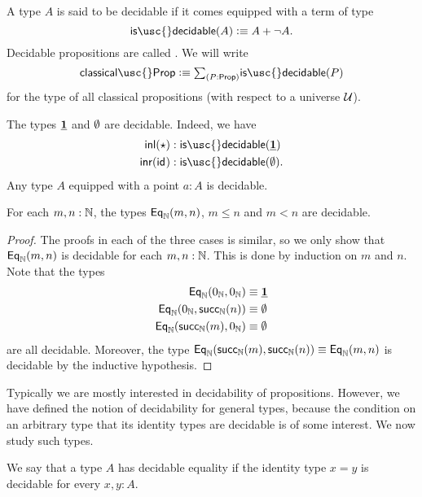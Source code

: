 \begin{defn}
  A type $A$ is said to be decidable if it comes equipped with a term of type
  \begin{equation*}
    \mathsf{is\usc{}decidable}(A)\defeq A+\neg A.
  \end{equation*}
  Decidable propositions are called . We will write
  \begin{equation*}
    \mathsf{classical\usc{}Prop} \defeq \sm{P:\mathsf{Prop}}\mathsf{is\usc{}decidable}(P)
  \end{equation*}
  for the type of all classical propositions (with respect to a universe $\mathcal{U}$).
\end{defn}

\begin{eg}
  The types $\underline{\mathbf{1}}$ and $\emptyset$ are decidable. Indeed, we have
  \begin{align*}
    \inl(\ttt) & :\mathsf{is\usc{}decidable}(\unit) \\
    \inr(\idfunc) & : \mathsf{is\usc{}decidable}(\emptyt).\qedhere
  \end{align*}
  Any type $A$ equipped with a point $a:A$ is decidable.
\end{eg}

\begin{lem}
  For each $m,n:{\mathbb{N}}$, the types $\mathsf{Eq}_{{\mathbb{N}}}(m,n)$, $m\leq n$ and $m<n$ are decidable.
\end{lem}

\begin{proof}
  The proofs in each of the three cases is similar, so we only show that $\mathsf{Eq}_{{\mathbb{N}}}(m,n)$ is decidable for each $m,n:{\mathbb{N}}$. This is done by induction on $m$ and $n$. Note that the types
  \begin{align*}
    \mathsf{Eq}_{{\mathbb{N}}}(0_{{\mathbb{N}}},0_{{\mathbb{N}}}) & \equiv \underline{\mathbf{1}} \\
    \mathsf{Eq}_{{\mathbb{N}}}(0_{{\mathbb{N}}},\mathsf{succ}_{{\mathbb{N}}}(n)) & \equiv \emptyset \\
    \mathsf{Eq}_{{\mathbb{N}}}(\mathsf{succ}_{{\mathbb{N}}}(m),0_{{\mathbb{N}}}) & \equiv \emptyset 
  \end{align*}
  are all decidable. Moreover, the type $\mathsf{Eq}_{{\mathbb{N}}}(\mathsf{succ}_{{\mathbb{N}}}(m),\mathsf{succ}_{{\mathbb{N}}}(n))\equiv \mathsf{Eq}_{{\mathbb{N}}}(m,n)$ is decidable by the inductive hypothesis.
\end{proof}

Typically we are mostly interested in decidability of propositions. However, we have defined the notion of decidability for general types, because the condition on an arbitrary type that its identity types are decidable is of some interest. We now study such types.

\begin{defn}
  We say that a type $A$ has decidable equality if the identity type $x=y$ is decidable for every $x,y:A$. 
\end{defn}

